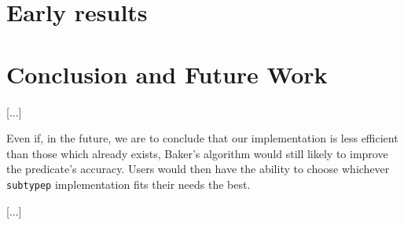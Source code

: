 \documentclass[format=sigconf]{acmart}
\newcommand\code[2][\small]{\sloppy\texttt{#1#2}}
\theoremstyle{definition}
\begin{document}
\section{Early results}
\label{sec:res}

\section{Conclusion and Future Work}
[...]

Even if, in the future, we are to conclude that our implementation is less
efficient than those which already exists, Baker's algorithm would still likely to
improve the predicate's accuracy. Users would then have the ability to
choose whichever \code{subtypep} implementation fits their needs the best.

[...]


\end{document}

